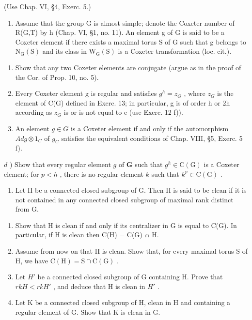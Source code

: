 (Use Chap. VI, §4, Exerc. 5.)

\begin{enumerate}
\def\labelenumi{\arabic{enumi})}
\setcounter{enumi}{13}
\tightlist
\item
  Assume that the group G is almost simple; denote the Coxeter number of R(G,T) by h (Chap. VI, §1, no. 11). An element g of G is said to be a Coxeter element if there exists a maximal torus S of G such that g belongs to \(\mathrm{N}_{\mathrm{G}}(\mathrm{S})\) and its class in \(\mathrm{W}_{\mathrm{G}}(\mathrm{S})\) is a Coxeter transformation (loc. cit.).
\end{enumerate}

\begin{enumerate}
\def\labelenumi{\alph{enumi})}
\item
  Show that any two Coxeter elements are conjugate (argue as in the proof of the Cor. of Prop. 10, no. 5).
\item
  Every Coxeter element g is regular and satisfies \(g^{h} = z_{G}\) , where \(z_{G}\) is the element of C(G) defined in Exerc. 13; in particular, g is of order h or 2h according as \(z_{G}\) is or is not equal to e (use Exerc. 12 f)).
\item
  An element \(g \in G\) is a Coxeter element if and only if the automorphism \(Ad g \otimes 1_{C}\) of \(g_{C}\) satisfies the equivalent conditions of Chap. VIII, §5, Exerc. 5 f).
\end{enumerate}

\(d\) ) Show that every regular element \(g\) of \(\mathbf{G}\) such that \(g^{h}\in \mathrm{C}(\mathrm{G})\) is a Coxeter element; for \(p < h\) , there is no regular element \(k\) such that \(k^p\in \mathrm{C}(\mathrm{G})\) .

\begin{enumerate}
\def\labelenumi{\arabic{enumi})}
\setcounter{enumi}{14}
\tightlist
\item
  Let H be a connected closed subgroup of G. Then H is said to be clean if it is not contained in any connected closed subgroup of maximal rank distinct from G.
\end{enumerate}

\begin{enumerate}
\def\labelenumi{\alph{enumi})}
\item
  Show that H is clean if and only if its centralizer in G is equal to C(G). In particular, if H is clean then C(H) = C(G) ∩ H.
\item
  Assume from now on that H is clean. Show that, for every maximal torus S of H, we have \(\mathrm{C}(\mathrm{H}) = \mathrm{S} \cap \mathrm{C}(\mathrm{G})\) .
\item
  Let \(H'\) be a connected closed subgroup of G containing H. Prove that \(rkH < rkH'\) , and deduce that H is clean in \(H'\) .
\item
  Let K be a connected closed subgroup of H, clean in H and containing a regular element of G. Show that K is clean in G.
\end{enumerate}

